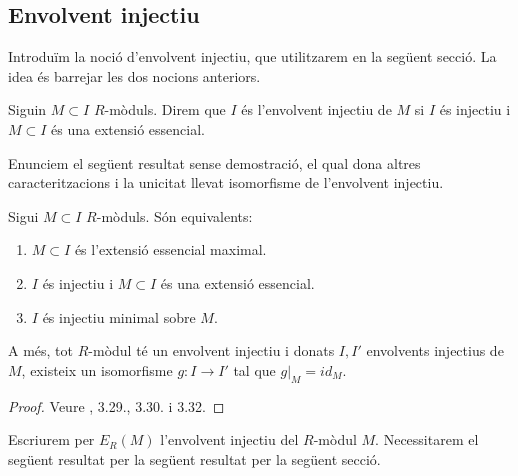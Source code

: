 \subsection{Envolvent injectiu}
Introduïm la noció d'envolvent injectiu, que utilitzarem en la següent secció. La idea és barrejar les dos nocions anteriors.
\begin{definicio}
    Siguin $M\subset I$ $R$-mòduls. Direm que $I$ és l'envolvent injectiu de $M$ si $I$ és injectiu i $M\subset I$ és una extensió essencial.
\end{definicio}
Enunciem el següent resultat sense demostració, el qual dona altres caracteritzacions i la unicitat llevat isomorfisme de l'envolvent injectiu.
\begin{proposicio}
    Sigui $M\subset I$ $R$-mòduls. Són equivalents:
    \begin{enumerate}
        \item $M\subset I$ és l'extensió essencial maximal.
        \item $I$ és injectiu i $M\subset I$ és una extensió essencial.
        \item $I$ és injectiu minimal sobre $M$.
    \end{enumerate}
    A més, tot $R$-mòdul té un envolvent injectiu i donats $I,I'$ envolvents injectius de $M$, existeix un isomorfisme $g:I\rightarrow I'$ tal que $g|_{M}=id_{M}$.
    \begin{proof}
        Veure \cite{Lam1999}, 3.29., 3.30. i 3.32.
    \end{proof}
\end{proposicio}
Escriurem per $E_{R}(M)$ l'envolvent injectiu del $R$-mòdul $M$. Necessitarem el següent resultat per la següent resultat per la següent secció.
